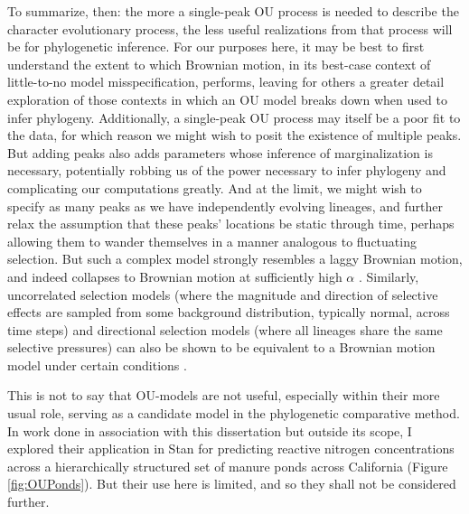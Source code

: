 To summarize, then: the more a single-peak OU process is needed to describe the character evolutionary process, the less useful realizations from that process will be for phylogenetic inference. For our purposes here, it may be best to first understand the extent to which Brownian motion, in its best-case context of little-to-no model misspecification, performs, leaving for others a greater detail exploration of those contexts in which an OU model breaks down when used to infer phylogeny. Additionally, a single-peak OU process may itself be a poor fit to the data, for which reason we might wish to posit the existence of multiple peaks. But adding peaks also adds parameters whose inference of marginalization is necessary, potentially robbing us of the power necessary to infer phylogeny and complicating our computations greatly. And at the limit, we might wish to specify as many peaks as we have independently evolving lineages, and further relax the assumption that these peaks' locations be static through time, perhaps allowing them to wander themselves in a manner analogous to fluctuating selection. But such a complex model strongly resembles a laggy Brownian motion, and indeed collapses to Brownian motion at sufficiently high $\alpha$ \citep{hansenTranslatingMicroevolutionaryProcess1996}. Similarly, uncorrelated selection models (where the magnitude and direction of selective effects are sampled from some background distribution, typically normal, across time steps) and directional selection models (where all lineages share the same selective pressures) can also be shown to be equivalent to a Brownian motion model under certain conditions \citep{hansenTranslatingMicroevolutionaryProcess1996}.

This is not to say that OU-models are not useful, especially within their more usual role, serving as a candidate model in the phylogenetic comparative method. In work done in association with this dissertation but outside its scope, I explored their application in Stan for predicting reactive nitrogen concentrations across a hierarchically structured set of manure ponds across California (Figure \ref{fig:OUPonds}). But their use here is limited, and so they shall not be considered further.

